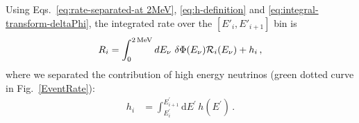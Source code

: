\documentclass[a4paper,11pt]{article}
\renewcommand\({\left(}
\renewcommand\){\right)}
\renewcommand\[{\left[}
\renewcommand\]{\right]}
\newcommand{\df}{\text{d}}
\newcommand{\al}[1]{\begin{align}#1\end{align}}
\newcommand{\paren}[1]{\left(#1\right)}
\newcommand{\fn}[1]{\!\paren{#1}} %
\newcommand{\GG}[1]{{\color[cmyk]{1,0.5,0,0}#1}}%
\theoremstyle{definition}
\newcommand{\mc}{\mathcal}
\newcommand{\pr}{\prime}
\begin{document}
Using Eqs.~\eqref{eq:rate-separated-at 2MeV}, \eqref{eq:h-definition} and \eqref{eq:integral-transform-deltaPhi}, the integrated rate over the $[E'_i,E'_{i+1}]$ bin is
\begin{eqnarray}
    R_i =\int_0^{2\,{\rm MeV}}dE_{\nu}~\delta\Phi(E_{\nu}) \mathcal{R}_i(E_{\nu})+h_i\,,
\end{eqnarray}
where we separated the contribution of high energy neutrinos (green dotted curve in 
Fig.~\ref{EventRate}):
\al{
    h_i &= \int_{E^\pr_i}^{E^\pr_{i+1}} \df E^\pr\, h\fn{E^\pr}\,.
}


\end{document}
